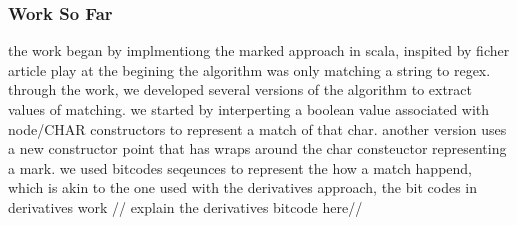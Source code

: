 \documentclass[11pt]{article}
\begin{document}
\subsubsection{Work So Far}
the work began by implmentiong the marked approach in scala, inspited by ficher article play \cite{Fischer2010}
at the begining the algorithm was only matching a string to regex. through the work, we developed several 
versions of the algorithm to extract values of matching. we started by interperting a boolean value associated
with node/CHAR constructors to represent a match of that char. another version uses a new constructor point
that has wraps around the char consteuctor representing a mark.
we used bitcodes seqeunces to represent the how a match happend, which is akin to the one used with the derivatives approach, the bit codes in derivatives work 
// explain the derivatives bitcode here//
\end{document}

